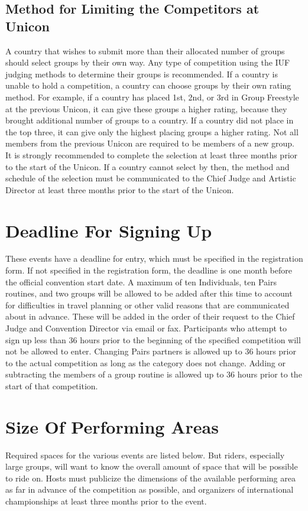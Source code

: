 \subsection{Method for Limiting the Competitors at Unicon}
A country that wishes to submit more than their allocated number of groups should select groups by their own way.
Any type of competition using the IUF judging methods to determine their groups is recommended.
If a country is unable to hold a competition, a country can choose groups by their own rating method.
For example, if a country has placed 1st, 2nd, or 3rd in Group Freestyle at the previous Unicon, it can give these groups a higher rating, because they brought additional number of groups to a country.
If a country did not place in the top three, it can give only the highest placing groups a higher rating.
Not all members from the previous Unicon are required to be members of a new group.
It is strongly recommended to complete the selection at least three months prior to the start of the Unicon.
If a country cannot select by then, the method and schedule of the selection must be communicated to the Chief Judge and Artistic Director at least three months prior to the start of the Unicon.

\section{Deadline For Signing Up}
These events have a deadline for entry, which must be specified in the registration form.
If not specified in the registration form, the deadline is one month before the official convention start date.
A maximum of ten Individuals, ten Pairs routines, and two groups will be allowed to be added after this time to account for difficulties in travel planning or other valid reasons that are communicated about in advance.
These will be added in the order of their request to the Chief Judge and Convention Director via email or fax.
Participants who attempt to sign up less than 36 hours prior to the beginning of the specified competition will not be allowed to enter.
Changing Pairs partners is allowed up to 36 hours prior to the actual competition as long as the category does not change.
Adding or subtracting the members of a group routine is allowed up to 36 hours prior to the start of that competition.

\section{Size Of Performing Areas}
Required spaces for the various events are listed below.
But riders, especially large groups, will want to know the overall amount of space that will be possible to ride on.
Hosts must publicize the dimensions of the available performing area as far in advance of the competition as possible, and organizers of international championships at least three months prior to the event.

